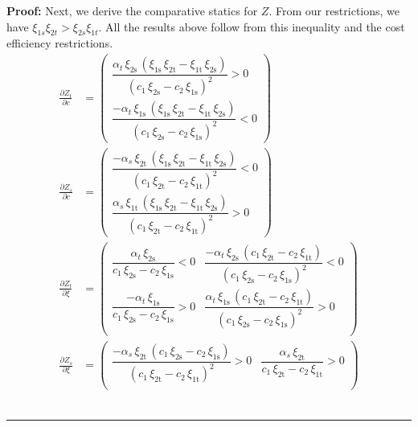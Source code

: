 \documentclass[11pt,a4paper]{extarticle}
\newenvironment{proof}[1][Proof]{\noindent\textbf{#1:} }{\ \rule{0.5em}{0.5em}}
\begin{document}
\begin{proof}
	Next, we derive the comparative statics for $Z$. From our restrictions, we have $\xi_{1s}\xi_{2t} > \xi_{2s}\xi_{1t}$. All the results above follow from this inequality and the cost efficiency restrictions. 
	\begin{align*}
	\frac{\partial Z_t}{\partial c} &= 
	\begin{pmatrix}
	\dfrac{\alpha _{t}\,\xi _{\mathrm{2s}}\,\left(\xi _{\mathrm{1s}}\,\xi _{\mathrm{2t}}-\xi _{\mathrm{1t}}\,\xi _{\mathrm{2s}}\right)}{{\left(c_{1}\,\xi _{\mathrm{2s}}-c_{2}\,\xi _{\mathrm{1s}}\right)}^2}>0\\
	\dfrac{-\alpha _{t}\,\xi _{\mathrm{1s}}\,\left(\xi _{\mathrm{1s}}\,\xi _{\mathrm{2t}}-\xi _{\mathrm{1t}}\,\xi _{\mathrm{2s}}\right)}{{\left(c_{1}\,\xi _{\mathrm{2s}}-c_{2}\,\xi _{\mathrm{1s}}\right)}^2}<0
	\end{pmatrix}\\
	\frac{\partial Z_s}{\partial c} &= 
	\begin{pmatrix}
	\dfrac{-\alpha _{s}\,\xi _{\mathrm{2t}}\,\left(\xi _{\mathrm{1s}}\,\xi _{\mathrm{2t}}-\xi _{\mathrm{1t}}\,\xi _{\mathrm{2s}}\right)}{{\left(c_{1}\,\xi _{\mathrm{2t}}-c_{2}\,\xi _{\mathrm{1t}}\right)}^2} <0\\
	\dfrac{\alpha _{s}\,\xi _{\mathrm{1t}}\,\left(\xi _{\mathrm{1s}}\,\xi _{\mathrm{2t}}-\xi _{\mathrm{1t}}\,\xi _{\mathrm{2s}}\right)}{{\left(c_{1}\,\xi _{\mathrm{2t}}-c_{2}\,\xi _{\mathrm{1t}}\right)}^2} >0
	\end{pmatrix}\\
	\frac{\partial Z_t}{\partial \xi} &= 
	\begin{pmatrix}
	\dfrac{\alpha _{t}\,\xi _{\mathrm{2s}}}{c_{1}\,\xi _{\mathrm{2s}}-c_{2}\,\xi _{\mathrm{1s}}} < 0& \dfrac{-\alpha _{t}\,\xi _{\mathrm{2s}}\,\left(c_{1}\,\xi _{\mathrm{2t}}-c_{2}\,\xi _{\mathrm{1t}}\right)}{{\left(c_{1}\,\xi _{\mathrm{2s}}-c_{2}\,\xi _{\mathrm{1s}}\right)}^2} <0 \\
	\dfrac{-\alpha _{t}\,\xi _{\mathrm{1s}}}{c_{1}\,\xi _{\mathrm{2s}}-c_{2}\,\xi _{\mathrm{1s}}} >0& \dfrac{\alpha _{t}\,\xi _{\mathrm{1s}}\,\left(c_{1}\,\xi _{\mathrm{2t}}-c_{2}\,\xi _{\mathrm{1t}}\right)}{{\left(c_{1}\,\xi _{\mathrm{2s}}-c_{2}\,\xi _{\mathrm{1s}}\right)}^2} >0\\
	\end{pmatrix}\\
	\frac{\partial Z_s}{\partial \xi} &= 
	\begin{pmatrix}
	\dfrac{-\alpha _{s}\,\xi _{\mathrm{2t}}\,\left(c_{1}\,\xi _{\mathrm{2s}}-c_{2}\,\xi _{\mathrm{1s}}\right)}{{\left(c_{1}\,\xi _{\mathrm{2t}}-c_{2}\,\xi _{\mathrm{1t}}\right)}^2}> 0& \dfrac{\alpha _{s}\,\xi _{\mathrm{2t}}}{c_{1}\,\xi _{\mathrm{2t}}-c_{2}\,\xi _{\mathrm{1t}}} > 0\\

\end{pmatrix}
\end{align*}
\end{proof}
\end{document}
